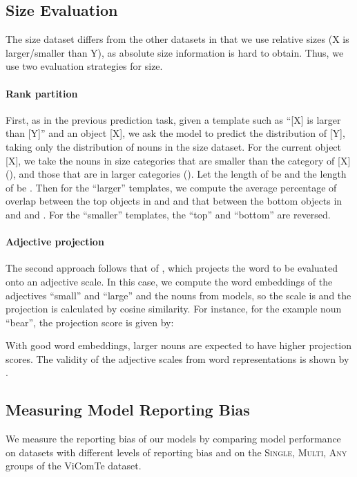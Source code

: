 \documentclass[11pt]{article}
\newcommand{\Single}{{\scshape Single}}
\newcommand{\Multi}{{\scshape Multi}}
\newcommand{\Any}{{\scshape Any}}
\newcommand{\dataset}{ViComTe}
\begin{document}
\subsection{Size Evaluation} \label{size-eval}
The size dataset differs from the other datasets in that we use relative sizes (X is larger/smaller than Y), as absolute size information is hard to obtain.
Thus, we use two evaluation strategies for size. 

\paragraph{Rank partition}
First, as in the previous prediction task, given a template such as ``[X] is larger than [Y]'' and an object [X], we ask the model to predict the distribution of [Y], taking only the distribution  of nouns in the size dataset. For the current object [X], we take the nouns in size categories that are smaller than the category of [X] (), and those that are in larger categories (). Let the length of  be  and the length of  be . Then for the ``larger'' templates, we compute the average percentage of overlap between the top  objects in  and  and that between the bottom  objects in  and and . For the ``smaller'' templates, the ``top'' and ``bottom'' are reversed.

\paragraph{Adjective projection}
The second approach follows that of \citet{color-adj}, which projects the word to be evaluated onto an adjective scale. In this case, we compute the word embeddings of the adjectives ``small'' and ``large'' and the nouns from models, so the scale is  and the projection is calculated by cosine similarity.
For instance, for the example noun ``bear'', the projection score is given by:
\vspace{-0.5em}

\noindent With good word embeddings, larger nouns are expected to have higher projection scores. The validity of the adjective scales from word representations is shown by \citet{kim-de-marneffe-2013-deriving}.


\subsection{Measuring Model Reporting Bias}

We measure the reporting bias of our models by comparing model performance on datasets with different levels of reporting bias and on the \Single{}, \Multi{}, \Any{} groups of the {\dataset} dataset.
\end{document}
